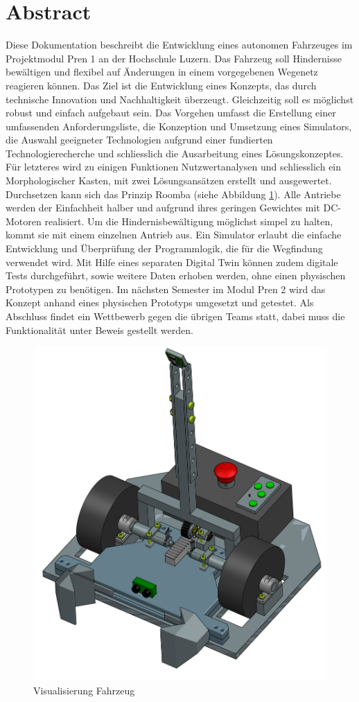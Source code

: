 \newpage
\section{Abstract}

Diese Dokumentation beschreibt die Entwicklung eines autonomen Fahrzeuges im Projektmodul Pren 1 an der Hochschule Luzern. Das Fahrzeug soll Hindernisse bewältigen und flexibel auf Änderungen in einem vorgegebenen Wegenetz reagieren können. Das Ziel ist die Entwicklung eines Konzepts, das durch technische Innovation und Nachhaltigkeit überzeugt. Gleichzeitig soll es möglichst robust und einfach aufgebaut sein.
Das Vorgehen umfasst die Erstellung einer umfassenden Anforderungsliste, die Konzeption und Umsetzung eines Simulators, die Auswahl geeigneter Technologien aufgrund einer fundierten Technologierecherche und schliesslich die Ausarbeitung eines Lösungskonzeptes. Für letzteres wird zu einigen Funktionen Nutzwertanalysen und schliesslich ein Morphologischer Kasten, mit zwei Lösungsansätzen erstellt und ausgewertet. Durchsetzen kann sich das Prinzip Roomba (siehe Abbildung \ref{img:Visualisierung Fahrzeug}). Alle Antriebe werden der Einfachheit halber und aufgrund ihres geringen Gewichtes mit DC-Motoren realisiert. Um die Hindernisbewältigung möglichst simpel zu halten, kommt sie mit einem einzelnen Antrieb aus. Ein Simulator erlaubt die einfache Entwicklung und Überprüfung der Programmlogik, die für die Wegfindung verwendet wird. Mit Hilfe eines separaten Digital Twin können zudem digitale Tests durchgeführt, sowie weitere Daten erhoben werden, ohne einen physischen Prototypen zu benötigen. 
Im nächsten Semester im Modul Pren 2 wird das Konzept anhand eines physischen Prototyps umgesetzt und getestet. Als Abschluss findet ein Wettbewerb gegen die übrigen Teams statt, dabei muss die Funktionalität unter Beweis gestellt werden.

\begin{figure}[H] %
    \centering
        \includegraphics[width=0.5\linewidth]{Skizze_Fahrzeug.png}
        \caption[Visualisierung Fahrzeug]
        {Visualisierung Fahrzeug}
        
        \label{img:Visualisierung Fahrzeug}
    \end{figure} 